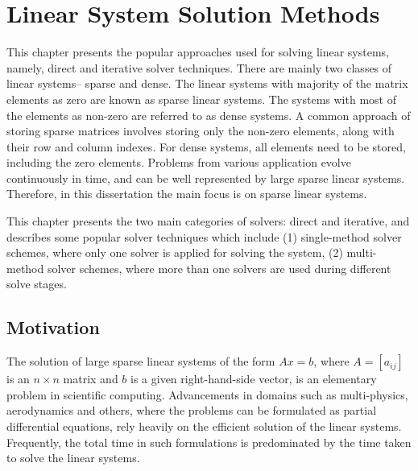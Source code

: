 \chapter{Linear System Solution Methods} \label{LS} 
This chapter presents the popular approaches used for solving linear systems, namely, 
direct and iterative solver techniques. %
There are mainly two
classes of linear systems-- sparse and dense. The linear systems with majority of
the matrix elements as zero are known as sparse linear systems. The systems with most
of the elements as non-zero are referred to as dense systems. A common
approach of storing sparse matrices involves storing only the non-zero elements, along
with their row and column indexes. For dense systems, all elements need to be
stored, including the zero elements. Problems from various application evolve continuously in time, and can be well represented by large sparse linear systems. Therefore, in this dissertation the main focus is on sparse linear systems.

This chapter presents the two main categories of solvers: direct and iterative, and describes some popular solver techniques which include (1) single-method solver schemes, where only one solver is applied for solving the system, (2) multi-method solver schemes, where more than one solvers are used during different solve stages. 

\section{Motivation}
The solution of large sparse linear systems of the form $Ax = b$, where $A = [a_{ij} ]$ is an $n \times n$ matrix and $b$ is a given right-hand-side vector, is an elementary problem in scientific computing. Advancements in domains such as multi-physics, aerodynamics and others, where the problems can be formulated as partial differential equations, rely heavily on the efficient solution of the linear systems. Frequently, the total time in such formulations is predominated by the time taken to solve the linear systems.

